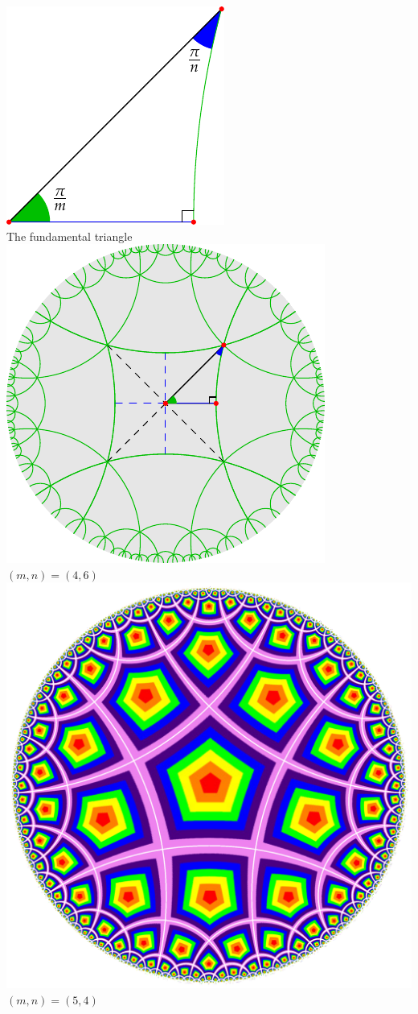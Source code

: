 \hfill
\begin{minipage}[t]{0.44\linewidth}\vspace{-20pt}
	\centering
	\includegraphics{isom-right3}\\
	The fundamental triangle\bigbreak
	\includegraphics{isom-tiling}\\
	$(m,n)=(4,6)$\bigbreak
	\includegraphics[scale=0.112]{tiling}\\
	$(m,n)=(5,4)$
\end{minipage}
